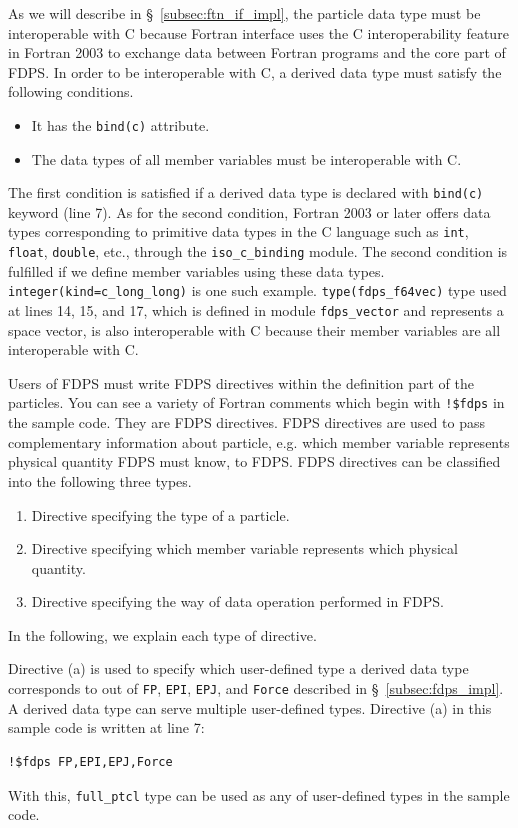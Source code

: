 \documentclass[twocolumn,useamsfonts]{pasj01}
\begin{document}
As we will describe in \S~\ref{subsec:ftn_if_impl}, the particle data type must be interoperable with C because Fortran interface uses the C interoperability feature in Fortran 2003 to exchange data between Fortran programs and the core part of FDPS. In order to be interoperable with C, a derived data type must satisfy the following conditions.
\begin{itemize}
\item It has the \texttt{bind(c)} attribute.
\item The data types of all member variables must be interoperable with C.
\end{itemize}
The first condition is satisfied if a derived data type is declared with \texttt{bind(c)} keyword (line 7). As for the second condition, Fortran 2003 or later offers data types corresponding to primitive data types in the C language such as \texttt{int}, \texttt{float}, \texttt{double}, etc.,  through the \texttt{iso\_c\_binding} module. The second condition is fulfilled if we define member variables using these data types. \texttt{integer(kind=c\_long\_long)} is one such example. \texttt{type(fdps\_f64vec)} type used at lines 14, 15, and 17, which is defined in module \texttt{fdps\_vector} and represents a space vector, is also interoperable with C because their member variables are all interoperable with C.

Users of FDPS must write FDPS directives within the definition part of the particles. You can see a variety of Fortran comments which begin with  \texttt{!\$fdps} in the sample code. They are FDPS directives. FDPS directives are used to pass complementary information about particle, e.g. which member variable represents physical quantity FDPS must know, to FDPS. FDPS directives can be classified into the following three types.
\begin{enumerate}[label=(\alph*)]
\item Directive specifying the type of a particle. 
\item Directive specifying which member variable represents which physical quantity.
\item Directive specifying the way of data operation performed in FDPS.  
\end{enumerate}
In the following, we explain each type of directive.

Directive (a) is used to specify which user-defined type a derived data type corresponds to out of \texttt{FP}, \texttt{EPI}, \texttt{EPJ}, and \texttt{Force} described in \S~\ref{subsec:fdps_impl}. A derived data type can serve multiple user-defined types. Directive (a) in this sample code is written at line 7:
\begin{verbatim}
!$fdps FP,EPI,EPJ,Force
\end{verbatim}
With this, \texttt{full\_ptcl} type can be used as any of user-defined types in the sample code.
\end{document}
